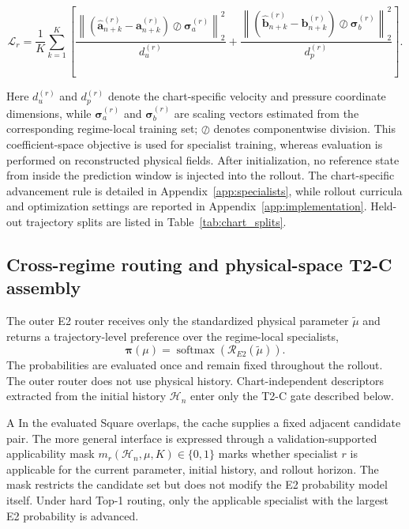 \documentclass{article}
\providecommand{\DIFaddtex}[1]{{\protect\color{blue} \sf #1}} %
\providecommand{\DIFdeltex}[1]{{\protect\color{red} \scriptsize #1}} %
\providecommand{\DIFaddbegin}{} %
\providecommand{\DIFaddend}{} %
\providecommand{\DIFdelbegin}{} %
\providecommand{\DIFdelend}{} %
\providecommand{\DIFadd}[1]{\texorpdfstring{\DIFaddtex{#1}}{#1}} %
\providecommand{\DIFdel}[1]{\texorpdfstring{\DIFdeltex{#1}}{}} %
\begin{document}
\begin{equation}
  \mathcal L_r=\frac{1}{K}\sum_{k=1}^{K}\left[
  \frac{\left\|(\widehat{\bm a}_{n+k}^{(r)}-\bm a_{n+k}^{(r)})
  \oslash\bm\sigma_a^{(r)}\right\|_2^2}{d_u^{(r)}}
  +\frac{\left\|(\widehat{\bm b}_{n+k}^{(r)}-\bm b_{n+k}^{(r)})
  \oslash\bm\sigma_b^{(r)}\right\|_2^2}{d_p^{(r)}}\right].
  \label{eq:main_rollout_loss}
\end{equation}


Here $d_u^{(r)}$ and $d_p^{(r)}$ denote the chart-specific velocity and pressure coordinate dimensions, while $\bm\sigma_a^{(r)}$ and $\bm\sigma_b^{(r)}$ are scaling
vectors estimated from the corresponding regime-local training set; $\oslash$ denotes componentwise division. This coefficient-space objective is used for specialist training, whereas evaluation is performed on reconstructed physical fields. After initialization, no reference state from inside the prediction window is injected into the rollout. The chart-specific advancement rule is detailed in Appendix~\ref{app:specialists}, while rollout curricula and optimization settings are reported in Appendix~\ref{app:implementation}. Held-out trajectory splits are listed in Table~\ref{tab:chart_splits}.



\subsection{Cross-regime routing and physical-space T2-C assembly}

The outer E2 router receives only the standardized physical parameter $\widetilde\mu$ and returns a trajectory-level preference over the
regime-local specialists,
\[
\bm\pi(\mu)
=
\operatorname{softmax}\!\left(
\mathcal R_{E2}(\widetilde\mu)
\right).
\]
The probabilities are evaluated once and remain fixed throughout the rollout. The outer router does not use physical history. Chart-independent descriptors extracted from the initial history $\mathcal H_n$ enter only the T2-C gate described below.

\DIFdelbegin \DIFdel{A }\DIFdelend \DIFaddbegin \DIFadd{In the evaluated Square overlaps, the cache supplies a fixed adjacent candidate pair. The more general interface is expressed through a }\DIFaddend validation-supported applicability mask $m_r(\mathcal H_n,\mu,K)\in\{0,1\}$ marks whether specialist $r$ is applicable for the current parameter, initial history, and rollout horizon. The mask restricts the candidate set but does not modify the E2 probability
model itself. Under hard Top-1 routing, only the applicable specialist with the largest E2 probability is advanced.
\end{document}
